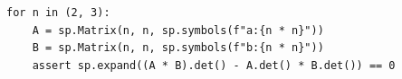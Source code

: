 %
\begin{lstlisting}
for n in (2, 3):
    A = sp.Matrix(n, n, sp.symbols(f"a:{n * n}"))
    B = sp.Matrix(n, n, sp.symbols(f"b:{n * n}"))
    assert sp.expand((A * B).det() - A.det() * B.det()) == 0
\end{lstlisting}
\comprobacionPie
